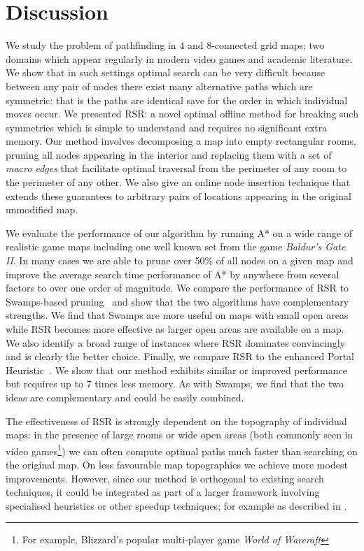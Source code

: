 \section{Discussion}
\label{cha::rsr::discussion}
We study the problem of pathfinding in 4 and 8-connected grid maps; two
domains which appear regularly in modern video games and academic literature.
We show that in such settings optimal search can be very difficult because
between any pair of nodes there exist many alternative paths which are
symmetric: that is the paths are identical save for the order in which
individual moves occur.  We presented RSR: a novel optimal offline method for
breaking such symmetries which is simple to understand and requires no
significant extra memory.  Our method involves decomposing a map into empty
rectangular rooms, pruning all nodes appearing in the interior and replacing
them with a set of \emph{macro edges} that facilitate optimal traversal from
the perimeter of any room to the perimeter of any other.  We also give an
online node insertion technique that extends these guarantees
 to arbitrary pairs of locations appearing in the original unmodified map.
\par
We evaluate the performance of our algorithm by running A* on a wide
range of realistic game maps including one well known set from the game
\emph{Baldur's Gate II}. 
In many cases we are able to prune over 50\% of all nodes on a given map
and improve the average search time performance of A* by anywhere from 
several factors to over one order of magnitude. 
We compare the performance of RSR to Swamps-based
pruning~\citep{pochter10} and show that the two algorithms have complementary
strengths.  We find that Swamps are more useful on maps with small open areas
while RSR becomes more effective as larger open areas are available on a map. We
also identify a broad range of instances where RSR dominates convincingly and is
clearly the better choice.  Finally, we compare RSR to the enhanced Portal
Heuristic~\citep{goldenberg10}.  We show that our method exhibits similar or
improved performance but requires up to 7 times less memory.  As with Swamps, we
find that the two ideas are complementary and could be easily combined.
\par
The effectiveness of RSR is strongly dependent on the topography of individual maps: 
in the presence of large rooms or wide open areas (both commonly seen in video games\footnote{For 
example, Blizzard's popular multi-player game \emph{World of Warcraft}})
we can often compute optimal paths much faster than searching on the original map. 
On less favourable map topographies we achieve more modest improvements.
However, since our method is orthogonal to existing search techniques, it could be integrated
as part of a larger framework involving specialised heuristics or other speedup techniques; 
for example as described in \citep{botea04,bjornsson05,bjornsson06}. 
